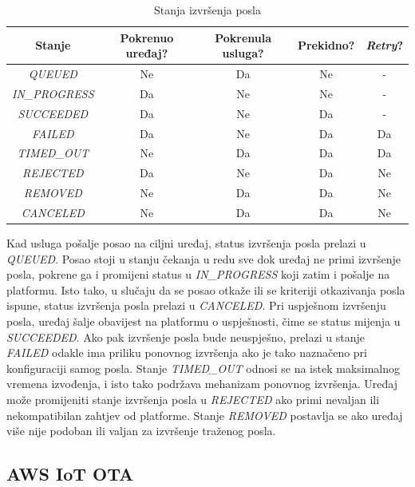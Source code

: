 \begin{table}[ht!]
	\centering
	\caption{Stanja izvršenja posla \cite{aws_docs}}
	\begin{tabular}{|c| c| c| c| c|}
		\hline
		\rowcolor{lightblue}  
		\textbf{Stanje} & \textbf{Pokrenuo uređaj?} & \textbf{Pokrenula usluga?} & \textbf{Prekidno?} & \textbf{\textit{Retry}?} \\ \hline
		\textit{QUEUED} & Ne & Da & Ne & - \\ \hline
		\textit{IN\_PROGRESS} & Da & Ne & Ne & - \\ \hline
		\textit{SUCCEEDED} & Da & Ne & Da & - \\ \hline
		\textit{FAILED} & Da & Ne & Da & Da \\ \hline
		\textit{TIMED\_OUT} & Ne & Da & Da & Da \\ \hline
		\textit{REJECTED} & Da & Ne & Da & Ne \\ \hline
		\textit{REMOVED} & Ne & Da & Da & Ne \\ \hline
		\textit{CANCELED} & Ne & Da & Da & Ne \\ \hline
	\end{tabular}
	\label{table:job_exec_states}
\end{table}

Kad usluga pošalje posao na ciljni uređaj, status izvršenja posla prelazi u \textit{QUEUED}. Posao stoji u stanju čekanja u redu sve dok uređaj ne primi izvršenje posla, pokrene ga i promijeni status u \textit{IN\_PROGRESS} koji zatim i pošalje na platformu. Isto tako, u slučaju da se posao otkaže ili se kriteriji otkazivanja posla ispune, status izvršenja posla prelazi u \textit{CANCELED}. Pri uspješnom izvršenju posla, uređaj šalje obavijest na platformu o uspješnosti, čime se status mijenja u \textit{SUCCEEDED}. Ako pak izvršenje posla bude neuspješno, prelazi u stanje \textit{FAILED} odakle ima priliku ponovnog izvršenja ako je tako naznačeno pri konfiguraciji samog posla. Stanje \textit{TIMED\_OUT} odnosi se na istek maksimalnog vremena izvođenja, i isto tako podržava mehanizam ponovnog izvršenja. Uređaj može promijeniti stanje izvršenja posla u \textit{REJECTED} ako primi nevaljan ili nekompatibilan zahtjev od platforme. Stanje \textit{REMOVED} postavlja se ako uređaj više nije podoban ili valjan za izvršenje traženog posla. 


\subsection{AWS IoT OTA}


